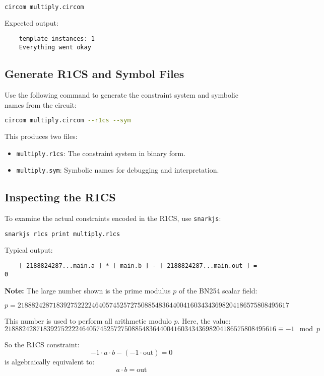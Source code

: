 \documentclass{article}
\begin{document}
\begin{lstlisting}[language=bash]
	circom multiply.circom
\end{lstlisting}
Expected output:
\begin{verbatim}
	template instances: 1
	Everything went okay
\end{verbatim}

\subsection{Generate R1CS and Symbol Files}
Use the following command to generate the constraint system and symbolic names from the circuit:

\begin{lstlisting}[language=bash]
	circom multiply.circom --r1cs --sym
\end{lstlisting}


This produces two files:
\begin{itemize}
	\item \texttt{multiply.r1cs}: The constraint system in binary form.
	\item \texttt{multiply.sym}: Symbolic names for debugging and interpretation.
\end{itemize}

\subsection{Inspecting the R1CS}
To examine the actual constraints encoded in the R1CS, use \texttt{snarkjs}:

\begin{lstlisting}[language=bash]
	snarkjs r1cs print multiply.r1cs
\end{lstlisting}
	
Typical output:
\begin{verbatim}
	[ 2188824287...main.a ] * [ main.b ] - [ 2188824287...main.out ] = 0
\end{verbatim}

\textbf{Note:} The large number shown is the prime modulus \( p \) of the BN254 scalar field:

\[
p = 21888242871839275222246405745257275088548364400416034343698204186575808495617
\]

This number is used to perform all arithmetic modulo \( p \). Here, the value:
\[
21888242871839275222246405745257275088548364400416034343698204186575808495616 \equiv -1 \mod p
\]

So the R1CS constraint:
\[
-1 \cdot a \cdot b - (-1 \cdot \text{out}) = 0
\]
is algebraically equivalent to:
\[
a \cdot b = \text{out}
\]
\end{document}
